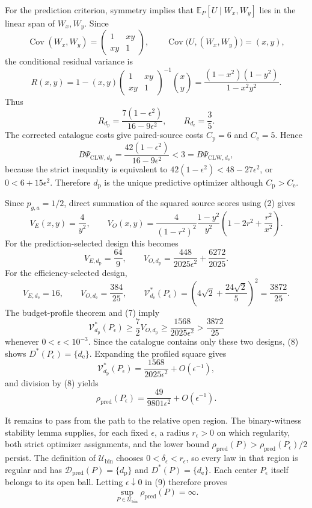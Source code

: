 For the prediction criterion, symmetry implies that \(\mathbb E_P[U\mid W_x,W_y]\) lies in the linear span of \(W_x,W_y\).  Since
\[
 \operatorname{Cov}(W_x,W_y)
 =\begin{pmatrix}1&xy\\xy&1\end{pmatrix},
 \qquad
 \operatorname{Cov}\bigl(U,(W_x,W_y)\bigr)=(x,y),
\]
the conditional residual variance is
\[
 R(x,y)=1-(x,y)
 \begin{pmatrix}1&xy\\xy&1\end{pmatrix}^{-1}
 \binom{x}{y}
 =\frac{(1-x^2)(1-y^2)}{1-x^2y^2}. \tag{3}
\]
Thus
\[
 R_{d_{\mathrm p}}=\frac{7(1-\epsilon^2)}{16-9\epsilon^2},
 \qquad
 R_{d_{\mathrm e}}=\frac35. \tag{4}
\]
The corrected catalogue costs give paired-source costs \(C_{\mathrm p}=6\) and \(C_{\mathrm e}=5\).  Hence
\[
 B\Psi_{\mathrm{CLW},d_{\mathrm p}}
 =\frac{42(1-\epsilon^2)}{16-9\epsilon^2}
 <3
 =B\Psi_{\mathrm{CLW},d_{\mathrm e}}, \tag{5}
\]
because the strict inequality is equivalent to \(42(1-\epsilon^2)<48-27\epsilon^2\), or \(0<6+15\epsilon^2\).  Therefore \(d_{\mathrm p}\) is the unique predictive optimizer although \(C_{\mathrm p}>C_{\mathrm e}\).

Since \(p_{g,a}=1/2\), direct summation of the squared source scores using (2) gives
\[
 V_E(x,y)=\frac4{y^2},
 \qquad
 V_O(x,y)=\frac4{(1-r^2)^2}\frac{1-y^2}{y^2}
 \left(1-2r^2+\frac{r^2}{x^2}\right). \tag{6}
\]
For the prediction-selected design this becomes
\[
 V_{E,d_{\mathrm p}}=\frac{64}{9},
 \qquad
 V_{O,d_{\mathrm p}}
 =\frac{448}{2025\epsilon^2}+\frac{6272}{2025}. \tag{7}
\]
For the efficiency-selected design,
\[
 V_{E,d_{\mathrm e}}=16,
 \qquad
 V_{O,d_{\mathrm e}}=\frac{384}{25},
 \qquad
 \mathcal V_{d_{\mathrm e}}^*(P_\epsilon)
 =\left(4\sqrt2+\frac{24\sqrt2}{5}\right)^2
 =\frac{3872}{25}. \tag{8}
\]
The budget-profile theorem and (7) imply
\[
 \mathcal V_{d_{\mathrm p}}^*(P_\epsilon)
 \ge \frac72 V_{O,d_{\mathrm p}}
 \ge \frac{1568}{2025\epsilon^2}
 >\frac{3872}{25}
\]
whenever \(0<\epsilon<10^{-3}\).  Since the catalogue contains only these two designs, (8) shows \(D^*(P_\epsilon)=\{d_{\mathrm e}\}\).  Expanding the profiled square gives
\[
 \mathcal V_{d_{\mathrm p}}^*(P_\epsilon)
 =\frac{1568}{2025\epsilon^2}+O(\epsilon^{-1}),
\]
and division by (8) yields
\[
 \rho_{\mathrm{pred}}(P_\epsilon)
 =\frac{49}{9801\epsilon^2}+O(\epsilon^{-1}). \tag{9}
\]

It remains to pass from the path to the relative open region.  The binary-witness stability lemma supplies, for each fixed \(\epsilon\), a radius \(r_\epsilon>0\) on which regularity, both strict optimizer assignments, and the lower bound \(\rho_{\mathrm{pred}}(P)>\rho_{\mathrm{pred}}(P_\epsilon)/2\) persist.  The definition of \(\mathcal U_{\mathrm{bin}}\) chooses \(0<\delta_\epsilon<r_\epsilon\), so every law in that region is regular and has \(\mathcal D_{\mathrm{pred}}(P)=\{d_{\mathrm p}\}\) and \(D^*(P)=\{d_{\mathrm e}\}\).  Each center \(P_\epsilon\) itself belongs to its open ball.  Letting \(\epsilon\downarrow0\) in (9) therefore proves
\[
 \sup_{P\in\mathcal U_{\mathrm{bin}}}\rho_{\mathrm{pred}}(P)=\infty. \tag{10}
\]

